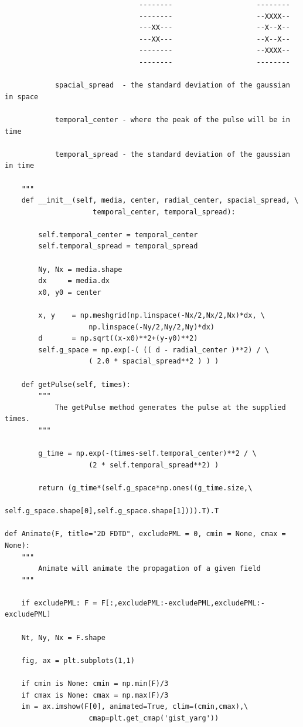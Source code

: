 \documentclass[12pt,twocolumn]{article}
\begin{document}
\begin{verbatim}
                                --------                    --------
                                --------                    --XXXX--
                                ---XX---                    --X--X--
                                ---XX---                    --X--X--
                                --------                    --XXXX--
                                --------                    --------

            spacial_spread  - the standard deviation of the gaussian in space

            temporal_center - where the peak of the pulse will be in time

            temporal_spread - the standard deviation of the gaussian in time

    """
    def __init__(self, media, center, radial_center, spacial_spread, \
                     temporal_center, temporal_spread):

        self.temporal_center = temporal_center
        self.temporal_spread = temporal_spread

        Ny, Nx = media.shape
        dx     = media.dx
        x0, y0 = center

        x, y    = np.meshgrid(np.linspace(-Nx/2,Nx/2,Nx)*dx, \
                    np.linspace(-Ny/2,Ny/2,Ny)*dx)
        d       = np.sqrt((x-x0)**2+(y-y0)**2)
        self.g_space = np.exp(-( (( d - radial_center )**2) / \
                    ( 2.0 * spacial_spread**2 ) ) )

    def getPulse(self, times):
        """
            The getPulse method generates the pulse at the supplied times.
        """

        g_time = np.exp(-(times-self.temporal_center)**2 / \
                    (2 * self.temporal_spread**2) )

        return (g_time*(self.g_space*np.ones((g_time.size,\
                    self.g_space.shape[0],self.g_space.shape[1]))).T).T

def Animate(F, title="2D FDTD", excludePML = 0, cmin = None, cmax = None):
    """
        Animate will animate the propagation of a given field
    """

    if excludePML: F = F[:,excludePML:-excludePML,excludePML:-excludePML]

    Nt, Ny, Nx = F.shape

    fig, ax = plt.subplots(1,1)

    if cmin is None: cmin = np.min(F)/3
    if cmax is None: cmax = np.max(F)/3
    im = ax.imshow(F[0], animated=True, clim=(cmin,cmax),\
                    cmap=plt.get_cmap('gist_yarg'))


\end{verbatim}
\end{document}
